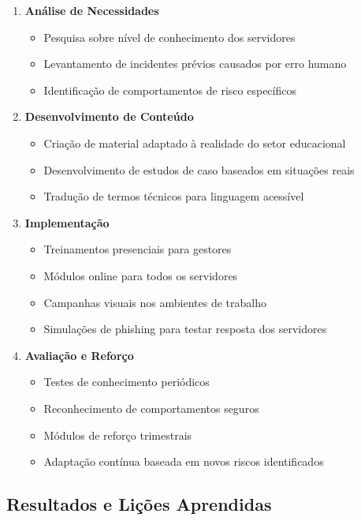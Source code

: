 \documentclass[12pt,a4paper]{report}
\begin{document}
\begin{enumerate}
  \item \textbf{Análise de Necessidades}
  \begin{itemize}
    \item Pesquisa sobre nível de conhecimento dos servidores
    \item Levantamento de incidentes prévios causados por erro humano
    \item Identificação de comportamentos de risco específicos
  \end{itemize}

  \item \textbf{Desenvolvimento de Conteúdo}
  \begin{itemize}
    \item Criação de material adaptado à realidade do setor educacional
    \item Desenvolvimento de estudos de caso baseados em situações reais
    \item Tradução de termos técnicos para linguagem acessível
  \end{itemize}

  \item \textbf{Implementação}
  \begin{itemize}
    \item Treinamentos presenciais para gestores
    \item Módulos online para todos os servidores
    \item Campanhas visuais nos ambientes de trabalho
    \item Simulações de phishing para testar resposta dos servidores
  \end{itemize}

  \item \textbf{Avaliação e Reforço}
  \begin{itemize}
    \item Testes de conhecimento periódicos
    \item Reconhecimento de comportamentos seguros
    \item Módulos de reforço trimestrais
    \item Adaptação contínua baseada em novos riscos identificados
  \end{itemize}
\end{enumerate}

\subsection{Resultados e Lições Aprendidas}
\end{document}
